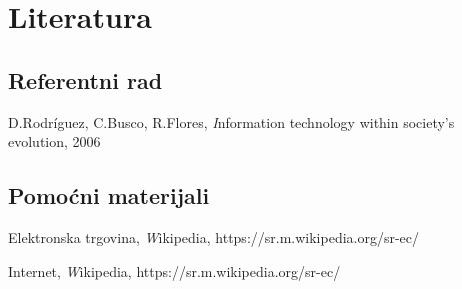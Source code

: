 \documentclass[10pt]{article}
\begin{document}
    \linespread{4}
    
	\section*{Literatura}
	\subsection*{Referentni rad}
	
		 \item D.Rodríguez, C.Busco, R.Flores,  \emph Information technology within society's evolution, 2006
		 
	\subsection*{Pomoćni materijali}
	
		 \item Elektronska trgovina, \emph Wikipedia, https://sr.m.wikipedia.org/sr-ec/
		 \item Internet,  \emph Wikipedia,  https://sr.m.wikipedia.org/sr-ec/
		 

	
\end{document}
